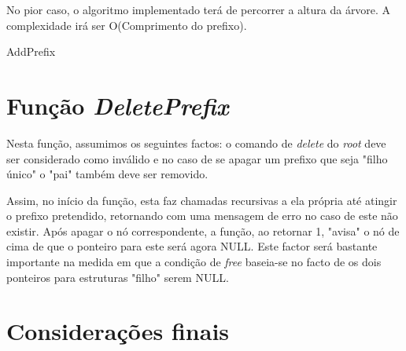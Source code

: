 \documentclass[a4paper]{article}
\begin{document}
No pior caso, o algoritmo implementado terá de percorrer a altura da árvore. A complexidade irá ser O(Comprimento do prefixo).

\begin{algorithm}[H]
 \caption{AddPrefix}
\end{algorithm}

\section{Função \textit{DeletePrefix}}
Nesta função, assumimos os seguintes factos: o comando de \textit{delete} do \textit{root} deve ser considerado como inválido e no caso de se apagar um prefixo que seja "filho único" o "pai" também deve ser removido.

Assim, no início da função, esta faz chamadas recursivas a ela própria até atingir o prefixo pretendido, retornando com uma mensagem de erro no caso de este não existir. Após apagar o nó correspondente, a função, ao retornar 1, "avisa" o nó de cima de que o ponteiro para este será agora NULL. Este factor será bastante importante na medida em que a condição de \textit{free} baseia-se no facto de os dois ponteiros para estruturas "filho" serem NULL. 
\section{Considerações finais}
\end{document}
